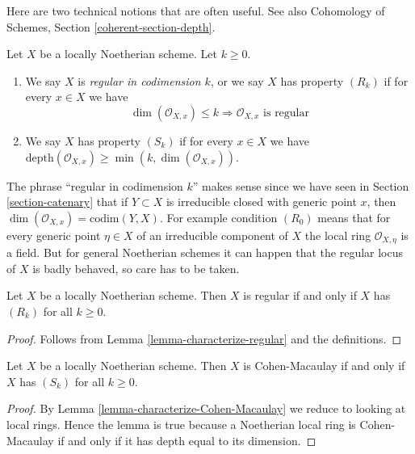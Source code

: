 \noindent
Here are two technical notions that are often useful.
See also Cohomology of Schemes, Section \ref{coherent-section-depth}.

\begin{definition}
\label{definition-Rk}
Let $X$ be a locally Noetherian scheme. Let $k \geq 0$.
\begin{enumerate}
\item We say $X$ is {\it regular in codimension $k$},
or we say $X$ has property {\it $(R_k)$} if for every $x \in X$
we have
$$
\dim(\mathcal{O}_{X, x}) \leq k
\Rightarrow
\mathcal{O}_{X, x}\text{ is regular}
$$
\item We say $X$ has property {\it $(S_k)$} if for every $x \in X$ we have
$\text{depth}(\mathcal{O}_{X, x}) \geq \min(k, \dim(\mathcal{O}_{X, x}))$.
\end{enumerate}
\end{definition}

\noindent
The phrase ``regular in codimension $k$'' makes sense since we have seen
in Section \ref{section-catenary} that if $Y \subset X$ is irreducible
closed with generic point $x$, then
$\dim(\mathcal{O}_{X, x}) = \text{codim}(Y, X)$. For example condition
$(R_0)$ means that for every generic point $\eta \in X$ of an irreducible
component of $X$ the local ring $\mathcal{O}_{X, \eta}$ is a field.
But for general Noetherian schemes it can happen that the regular locus
of $X$ is badly behaved, so care has to be taken.

\begin{lemma}
\label{lemma-scheme-regular-iff-all-Rk}
Let $X$ be a locally Noetherian scheme.
Then $X$ is regular if and only if $X$ has $(R_k)$ for all $k \geq 0$.
\end{lemma}

\begin{proof}
Follows from Lemma \ref{lemma-characterize-regular} and the definitions.
\end{proof}

\begin{lemma}
\label{lemma-scheme-CM-iff-all-Sk}
Let $X$ be a locally Noetherian scheme.
Then $X$ is Cohen-Macaulay if and only if $X$ has $(S_k)$ for all $k \geq 0$.
\end{lemma}

\begin{proof}
By Lemma \ref{lemma-characterize-Cohen-Macaulay}
we reduce to looking at local rings.
Hence the lemma is true because a Noetherian local ring is Cohen-Macaulay
if and only if it has depth equal to its dimension.
\end{proof}


